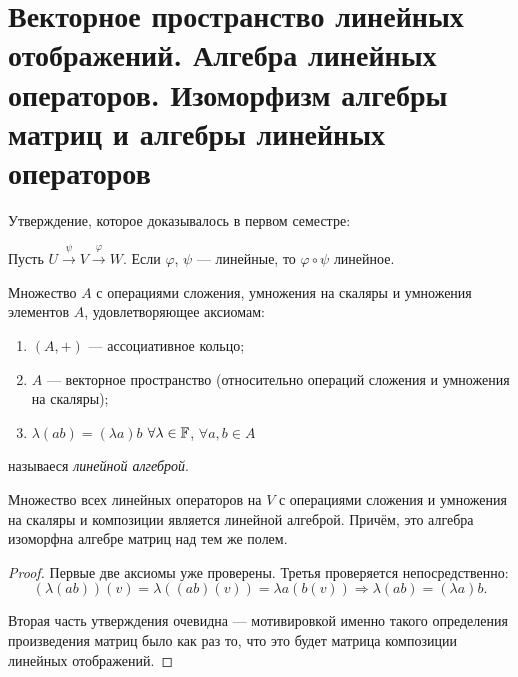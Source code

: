 \section{Векторное пространство линейных отображений. Алгебра линейных операторов. Изоморфизм алгебры матриц и алгебры линейных операторов}

Утверждение, которое доказывалось в первом семестре:

\begin{proposal}
    Пусть $U \overset{\psi}{\to} V \overset{\varphi}{\to} W$. Если $\varphi$, $\psi$ --- линейные, то $\varphi \circ \psi$ линейное.
\end{proposal}

\begin{definition}
    Множество $A$ с операциями сложения, умножения на скаляры и умножения элементов $A$, удовлетворяющее аксиомам:
    \begin{enumerate}[nolistsep]
        \item $(A, +)$ --- ассоциативное кольцо;
        \item $A$ --- векторное пространство (относительно операций сложения и умножения на скаляры);
        \item $\lambda(ab) = (\lambda a)b$ $\forall \lambda \in \mathbb{F}$, $\forall a, b \in A$
    \end{enumerate}
    называеся \textit{линейной алгеброй}.
\end{definition}

\begin{theorem}
    Множество всех линейных операторов на $V$ с операциями сложения и умножения на скаляры и композиции является линейной алгеброй. Причём, это алгебра изоморфна алгебре матриц над тем же полем.
\end{theorem}

\begin{proof}
    Первые две аксиомы уже проверены. Третья проверяется непосредственно:
    \[
        (\lambda(ab))(v) = \lambda((ab)(v)) = \lambda a(b(v)) \Rightarrow \lambda(ab) = (\lambda a)b.
    \]

    Вторая часть утверждения очевидна --- мотивировкой именно такого определения произведения матриц было как раз то, что это будет матрица композиции линейных отображений.
\end{proof}

